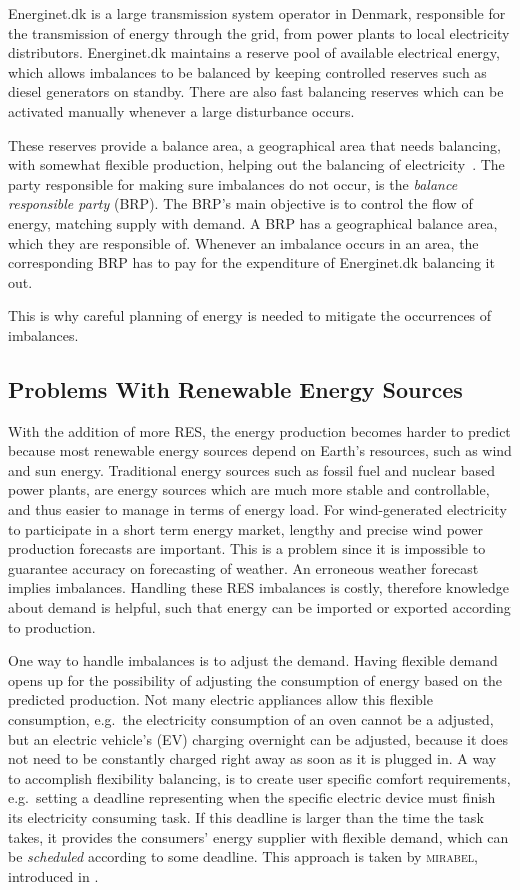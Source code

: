 Energinet.dk \cite{ENERGINET} is a large transmission system operator in Denmark, responsible for the transmission of energy through the grid, from power plants to local electricity distributors. Energinet.dk maintains a reserve pool of available electrical energy, which allows imbalances to be balanced by keeping controlled reserves such as diesel generators on standby. There are also fast balancing reserves which can be activated manually whenever a large disturbance occurs. 

These reserves provide a balance area, a geographical area that needs balancing, with somewhat flexible production, helping out the balancing of electricity~\cite{MIRABELD1.2}. The party responsible for making sure imbalances do not occur, is the \emph{balance responsible party} (BRP). The BRP's main objective is to control the flow of energy, matching supply with demand. A BRP has a geographical balance area, which they are responsible of. Whenever an imbalance occurs in an area, the corresponding BRP has to pay for the expenditure of Energinet.dk balancing it out. 

This is why careful planning of energy is needed to mitigate the occurrences of imbalances.

\subsection{Problems With Renewable Energy Sources}
With the addition of more RES, the energy production becomes harder to predict because most renewable energy sources depend on Earth's resources, such as wind and sun energy. Traditional energy sources such as fossil fuel and nuclear based power plants, are energy sources which are much more stable and controllable, and thus easier to manage in terms of energy load. For wind-generated electricity to participate in a short term energy market, lengthy and precise wind power production forecasts are important. This is a problem since it is impossible to guarantee  accuracy on forecasting of weather. An erroneous weather forecast implies imbalances. Handling these RES imbalances is costly, therefore knowledge about demand is helpful, such that energy can be imported or exported according to production. 

One way to handle imbalances is to adjust the demand. Having flexible demand opens up for the possibility of adjusting the consumption of energy based on the predicted production. Not many electric appliances allow this flexible consumption, e.g.\ the electricity consumption of an oven cannot be a adjusted, but an electric vehicle's (EV) charging overnight can be adjusted, because it does not need to be constantly charged right away as soon as it is plugged in. A way to accomplish flexibility balancing, is to create user specific comfort requirements, e.g.\ setting a deadline representing when the specific electric device must finish its electricity consuming task. If this deadline is larger than the time the task takes, it provides the consumers' energy supplier with flexible demand, which can be \emph{scheduled} according to  some deadline. This approach is taken by \textsc{mirabel}, introduced in . 
